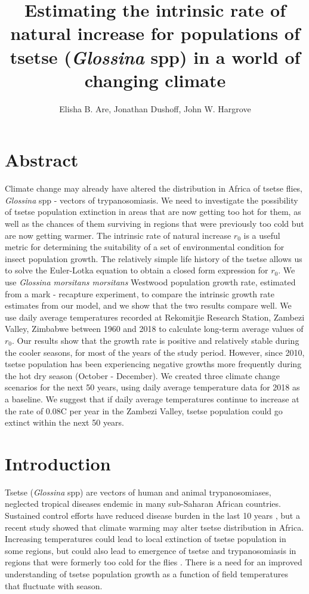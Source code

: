 \documentclass[12pt,a4paper]{article}
\author{Elisha B. Are, Jonathan Dushoff, John W. Hargrove}
\title{Estimating the intrinsic rate of natural increase for  populations of tsetse (\textit{Glossina} spp) in a world of changing climate}
\begin{document}
\maketitle

\section*{Abstract} 
Climate change may already have altered the distribution in Africa of tsetse flies, \textit{Glossina} spp - vectors of trypanosomiasis. We need to investigate the possibility of tsetse population extinction in areas that are now getting too hot for them, as well as the chances of them surviving in regions that were previously too cold but are now getting warmer. The intrinsic rate of natural increase $r_0$ is a useful metric for determining the suitability of a set of environmental condition for insect population growth.  The relatively simple life history of the tsetse allows us to solve the Euler-Lotka equation to obtain a closed form expression for  $r_0$. We use  \textit{Glossina morsitans morsitans} Westwood population growth rate, estimated from a mark - recapture experiment, to compare the intrinsic growth rate estimates from our model, and we show that the two results compare well. We use daily average temperatures recorded at Rekomitjie Research Station, Zambezi Valley, Zimbabwe between 1960 and 2018 to calculate long-term average values of  $r_0$. Our results show that the growth rate is positive and relatively stable during the cooler seasons, for most of the years of the study period. However, since 2010, tsetse population has been experiencing negative growths more frequently during the hot dry season (October - December).  We created three climate change scenarios for the next 50 years, using daily average temperature data for 2018 as a baseline. We suggest that if daily average temperatures continue to increase at the rate of 0.08\textdegree C per year in the Zambezi Valley, tsetse population could go extinct within the next 50 years.  
 
\section*{Introduction} 

Tsetse (\textit{Glossina} spp) are vectors of human and animal trypanosomiases, neglected tropical diseases endemic in many sub-Saharan African countries. Sustained control efforts have reduced disease burden in the last 10 years \cite{WorldHealthOrganizationWHO2018}, but a recent study showed that climate warming may alter tsetse distribution in Africa. Increasing temperatures could lead to local extinction of tsetse population in some regions, but could also lead to emergence of tsetse and trypanosomiasis in regions that were formerly too cold for the flies \cite{Lord2018}. There is a need for an improved understanding of tsetse population growth as a function of field temperatures that fluctuate with season. 
\end{document}
